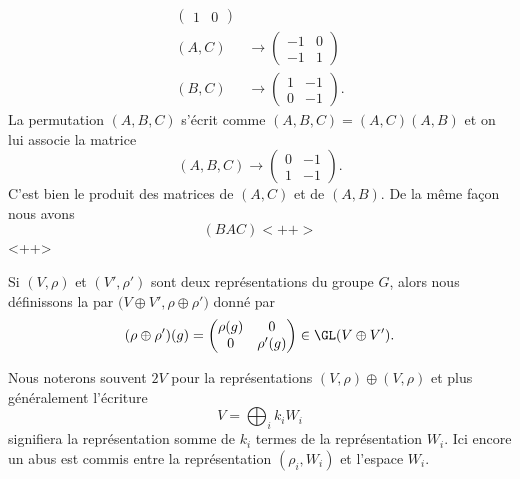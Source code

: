 \begin{example}
\begin{subequations}
\begin{align}
\begin{pmatrix}
                1    &   0    
            \end{pmatrix}\\
            (A,C)&\to \begin{pmatrix}
                -1    &   0    \\ 
                -1    &   1    
            \end{pmatrix}\\
            (B,C)&\to\begin{pmatrix}
                1    &   -1    \\ 
                0    &   -1    
            \end{pmatrix}.
        \end{align}
    \end{subequations}
    La permutation \( (A,B,C)\) s'écrit comme \( (A,B,C)=(A,C)(A,B)\) et on lui associe la matrice
    \begin{equation}
        (A,B,C)\to\begin{pmatrix}
            0    &   -1    \\ 
            1    &   -1    
        \end{pmatrix}.
    \end{equation}
    C'est bien le produit des matrices de \( (A,C)\) et de \( (A,B)\). De la même façon nous avons
    \begin{equation}
        (BAC)<++>
    \end{equation}
    <++>
\end{example}

Si \( (V,\rho)\) et \( (V',\rho')\) sont deux représentations du groupe \( G\), alors nous définissons la  par \( \big( V\oplus V',\rho\oplus\rho' \big)\) donné par
\begin{equation}
    (\rho\oplus\rho')(g)=\begin{pmatrix}
        \rho(g)    &   0    \\ 
        0    &   \rho'(g)    
    \end{pmatrix}\in \GL(V\oplus V').
\end{equation}

Nous noterons souvent \( 2V\) pour la représentations \( (V,\rho)\oplus (V,\rho)\) et plus généralement l'écriture
\begin{equation}
    V=\bigoplus_i k_iW_i
\end{equation}
signifiera la représentation somme de \( k_i\) termes de la représentation \( W_i\). Ici encore un abus est commis entre la représentation \( (\rho_i,W_i)\) et l'espace \( W_i\).

